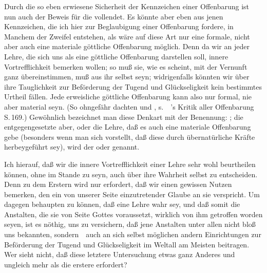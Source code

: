Durch die so eben erwiesene Sicherheit der Kennzeichen einer Offenbarung ist nun auch der Beweis für die  vollendet. Es könnte aber eben aus jenen Kennzeichen, die ich hier zur Beglaubigung einer Offenbarung fordere, in Manchem der Zweifel entstehen, als wäre auf diese Art nur eine formale, nicht aber auch eine materiale göttliche Offenbarung möglich. Denn da wir an jeder Lehre, die sich uns als eine göttliche Offenbarung darstellen soll, innere Vortrefflichkeit bemerken wollen; so muß sie, wie es scheint, mit der Vernunft ganz übereinstimmen, muß aus ihr selbst  seyn; widrigenfalls könnten wir über ihre Tauglichkeit zur Beförderung der Tugend und Glückseligkeit kein bestimmtes Urtheil fällen. Jede erweisliche göttliche Offenbarung kann also nur formal, nie aber material seyn. (So ohngefähr dachten  und , s.~\zB\ 's Kritik aller Offenbarung S.\,169.) Gewöhnlich bezeichnet man diese Denkart mit der Benennung: ; die entgegengesetzte aber, oder die Lehre, daß es auch eine materiale Offenbarung gebe (besonders wenn man sich vorstellt, daß diese durch übernatürliche Kräfte herbeygeführt sey), wird der  oder  genannt.\par
Ich  hierauf, daß wir die innere Vortrefflichkeit einer Lehre sehr wohl beurtheilen können, ohne im Stande zu seyn, auch über ihre Wahrheit selbst zu entscheiden. Denn zu dem Erstern wird nur erfordert, daß wir einen gewissen Nutzen bemerken, den ein von unserer Seite einzutretender Glaube an sie verspricht. Um dagegen behaupten zu können, daß eine Lehre wahr sey, und daß somit die Anstalten, die sie von Seite Gottes voraussetzt, wirklich von ihm getroffen worden seyen, ist es nöthig, uns zu versichern, daß jene Anstalten unter allen nicht bloß uns bekannten, sondern~\ auch an sich selbst möglichen andern Einrichtungen zur Beförderung der Tugend und Glückseligkeit im Weltall am Meisten beitragen. Wer sieht nicht, daß diese letztere Untersuchung etwas ganz Anderes und ungleich mehr als die erstere erfordert?


